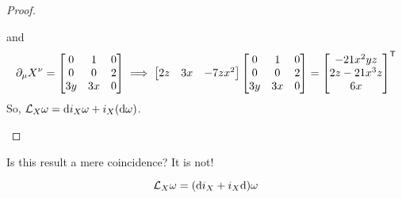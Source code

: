 \documentclass[a4paper, 10pt]{article}
\begin{document}
\begin{proof}
\begin{itemize}
        and
        \[ \partial_{\mu}X^{\nu} = \begin{bmatrix}0 & 1 & 0 \\ 0 & 0 & 2 \\ 3y & 3x & 0\end{bmatrix} \;\Longrightarrow\; \begin{bmatrix}2z & 3x & -7zx^{2}\end{bmatrix}\begin{bmatrix}0 & 1 & 0 \\ 0 & 0 & 2 \\ 3y & 3x & 0\end{bmatrix} = \begin{bmatrix}-21x^{2}yz \\ 2z-21x^{3}z \\ 6x\end{bmatrix}^{\mathsf{T}} \]
        So, $\mathcal{L}_{X}\omega = \mathrm{d} i_{X}\omega + i_{X}(\mathrm{d}\omega)$.
    \end{itemize}
\end{proof}
Is this result a mere coincidence? It is not!
\newpage


\begin{theorem}
    \[ \mathcal{L}_{X}\omega = (\mathrm{d} i_{X} + i_{X}\mathrm{d})\omega \]
\end{theorem}
\end{document}
